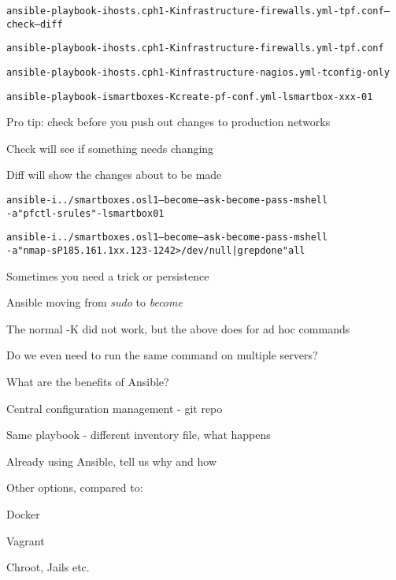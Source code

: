 \documentclass[18pt,landscape,a4paper,footrule]{foils}
\begin{document}

\begin{alltt}\footnotesize
ansible-playbook -i hosts.cph1 -K infrastructure-firewalls.yml -t pf.conf --check --diff

ansible-playbook -i hosts.cph1 -K infrastructure-firewalls.yml -t pf.conf

ansible-playbook -i hosts.cph1 -K infrastructure-nagios.yml -t config-only

ansible-playbook -i smartboxes -K create-pf-conf.yml -l smartbox-xxx-01
\end{alltt}

\begin{list2}
\item Pro tip: check before you push out changes to production networks \smiley
\item Check will see if something needs changing
\item Diff will show the changes about to be made
\end{list2}


\begin{alltt}\footnotesize
ansible -i ../smartboxes.osl1 --become --ask-become-pass -m shell
-a "pfctl -s rules" -l smartbox01

ansible -i ../smartboxes.osl1 --become --ask-become-pass -m shell
-a "nmap -sP 185.161.1xx.123-124 2> /dev/null| grep done" all
\end{alltt}

\begin{list2}
\item Sometimes you need a trick or persistence
\item Ansible moving from \emph{sudo} to \emph{become}
\item The normal -K did not work, but the above does for ad hoc commands
\end{list2}


Do we even need to run the same command on multiple servers?

What are the benefits of Ansible?
\begin{list2}
\item Central configuration management - git repo
\item Same playbook - different inventory file, what happens
\item Already using Ansible, tell us why and how
\end{list2}
 Other options, compared to:
\begin{list2}
\item Docker
\item Vagrant
\item Chroot, Jails etc.
\end{list2}
\end{document}
